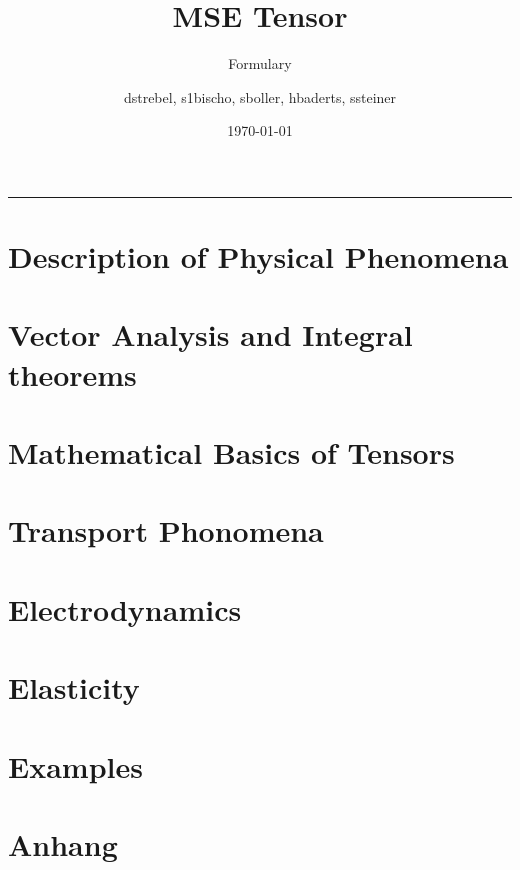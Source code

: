 \documentclass[a4paper, 10pt]{scrartcl}
\title{MSE Tensor}
\subtitle{Formulary}
\author{dstrebel, s1bischo, sboller, hbaderts, ssteiner}
\date{\today}
\begin{document}
	\maketitle 

	\setlength{\parskip}{0cm}
	\setcounter{tocdepth}{1}	
	
	\tableofcontents 	
	
	\smallskip 
	\rule{\textwidth}{0.5pt}
	\smallskip
	




	\section{Description of Physical Phenomena}
	
	\section{Vector Analysis and Integral theorems}

	\section{Mathematical Basics of Tensors}
	
	\section{Transport Phonomena}

			
	\section{Electrodynamics}

	\section{Elasticity}
    		

	\section{Examples}
	\section{Anhang}
\end{document}
